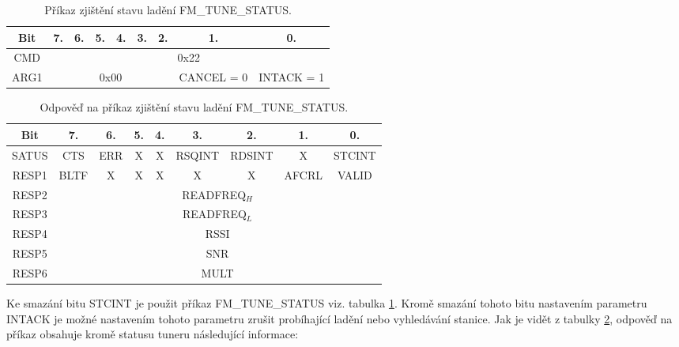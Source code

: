 \begin{table}[ht!]
\begin{center}
\begin{tabular}{|c|c|c|c|c|c|c|c|c|}
\hline 
Bit & 7. & 6. & 5. & 4. & 3. & 2. & 1. & 0. \\ 
\hline 
CMD & \multicolumn{8}{c|}{0x22} \\ 
\hline 
ARG1 & \multicolumn{6}{c|}{0x00} & CANCEL = 0 & INTACK = 1 \\ 
\hline 
\end{tabular} 
\end{center}
\caption{Příkaz zjištění stavu ladění FM\_TUNE\_STATUS.}
\label{tab:tuner-tune-status} 
\end{table}

\begin{table}[ht!]
\begin{center}
\begin{tabular}{|c|c|c|c|c|c|c|c|c|}
\hline 
Bit & 7. & 6. & 5. & 4. & 3. & 2. & 1. & 0. \\ 
\hline 
SATUS & CTS & ERR & X & X & RSQINT & RDSINT & X & STCINT \\ 
\hline 
RESP1 & BLTF & X & X & X & X & X & AFCRL & VALID \\ 
\hline 
RESP2 & \multicolumn{8}{c|}{READFREQ$_{{H}}$} \\ 
\hline 
RESP3 & \multicolumn{8}{c|}{READFREQ$_{{L}}$} \\ 
\hline 
RESP4 & \multicolumn{8}{c|}{RSSI} \\ 
\hline 
RESP5 & \multicolumn{8}{c|}{SNR} \\ 
\hline 
RESP6 & \multicolumn{8}{c|}{MULT} \\ 
\hline 
\end{tabular} 
\end{center}
\caption{Odpověď na příkaz zjištění stavu ladění FM\_TUNE\_STATUS.}
\label{tab:tuner-tune-status-resp} 
\end{table}

Ke smazání bitu STCINT je použit příkaz FM\_TUNE\_STATUS viz. tabulka \ref{tab:tuner-tune-status}. Kromě smazání tohoto bitu nastavením parametru INTACK je možné nastavením tohoto parametru zrušit probíhající ladění nebo vyhledávání stanice. Jak je vidět z tabulky \ref{tab:tuner-tune-status-resp}, odpověď na příkaz obsahuje kromě statusu tuneru následující informace:


